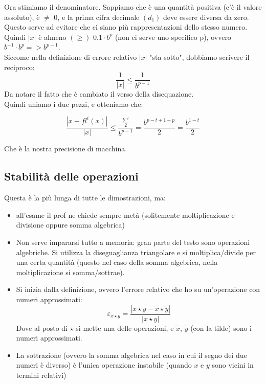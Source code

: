 Ora stimiamo il denominatore. Sappiamo che è una quantità positiva (c'è il valore assoluto), è $\neq$ 0, e la prima cifra decimale $(d_1)$ deve essere diversa da zero. Questo serve ad evitare che ci siano più rappresentazioni dello stesso numero.\\
Quindi $|x|$ è almeno $(\geq)$ $0.1 \cdot b^p$ (non ci serve uno specifico p), ovvero $b^{-1}\cdot b^p => b^{p-1}$.\\
Siccome nella definizione di errore relativo $|x|$ "sta sotto", dobbiamo scrivere il reciproco: 
\begin{displaymath}\frac{1}{|x|}\leq \frac{1}{b^{p-1}}\end{displaymath}
Da notare il fatto che è cambiato il verso della disequazione.\\
Quindi uniamo i due pezzi, e otteniamo che:\\
\begin{center}
    \large\begin{displaymath}
        \frac{|x-fl^t(x)|}{|x|}\leq \frac{\frac{b^{-t}}{2}}{b^{p-1}}= \frac{b^{p-t+1-p}}{2}= \frac{b^{1-t}}{2}
    \end{displaymath}
\end{center}
Che è la nostra precisione di macchina.
\newpage

\subsection{Stabilità delle operazioni}
Questa è la più lunga di tutte le dimostrazioni, ma:
\begin{itemize}
    \item all'esame il prof ne chiede sempre metà (solitemente moltiplicazione e divisione oppure somma algebrica)
    \item Non serve impararsi tutto a memoria: gran parte del testo sono operazioni algebriche. Si utilizza la diseguaglianza triangolare e si moltiplica/divide per una certa quantità (questo nel caso della somma algebrica, nella moltiplicazione si somma/sottrae).
    \item Si inizia dalla definizione, ovvero l'errore relativo che ho su un'operazione con numeri approssimati:\begin{displaymath}\varepsilon _{x\star y}=\frac{|x\star y - \widetilde{x}\star \widetilde{y}|}{|x \star y|} \end{displaymath}  Dove al posto di $\star$ si mette una delle operazioni, e $\widetilde{x}$, $\widetilde{y}$ (con la tilde) sono i numeri approssimati.
    \item La sottrazione (ovvero la somma algebrica nel caso in cui il segno dei due numeri è diverso) è l'unica operazione instabile (quando $x$ e $y$ sono vicini in termini relativi)
\end{itemize}

